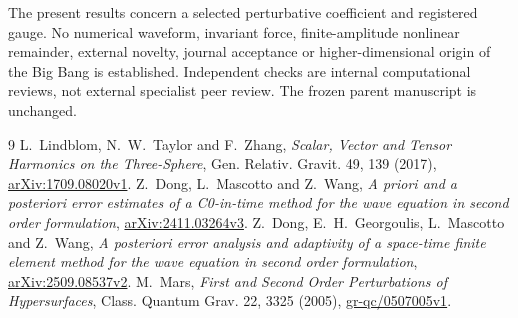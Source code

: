 \documentclass[11pt]{article}
\begin{document}
The present results concern a selected perturbative coefficient and registered gauge. No numerical waveform, invariant force, finite-amplitude nonlinear remainder, external novelty, journal acceptance or higher-dimensional origin of the Big Bang is established. Independent checks are internal computational reviews, not external specialist peer review. The frozen parent manuscript is unchanged.

\begin{thebibliography}{9}
 L.~Lindblom, N.~W.~Taylor and F.~Zhang, \emph{Scalar, Vector and Tensor Harmonics on the Three-Sphere}, Gen. Relativ. Gravit. 49, 139 (2017), \href{https://arxiv.org/abs/1709.08020v1}{arXiv:1709.08020v1}.
 Z.~Dong, L.~Mascotto and Z.~Wang, \emph{A priori and a posteriori error estimates of a C0-in-time method for the wave equation in second order formulation}, \href{https://arxiv.org/abs/2411.03264v3}{arXiv:2411.03264v3}.
 Z.~Dong, E.~H.~Georgoulis, L.~Mascotto and Z.~Wang, \emph{A posteriori error analysis and adaptivity of a space-time finite element method for the wave equation in second order formulation}, \href{https://arxiv.org/abs/2509.08537v2}{arXiv:2509.08537v2}.
 M.~Mars, \emph{First and Second Order Perturbations of Hypersurfaces}, Class. Quantum Grav. 22, 3325 (2005), \href{https://arxiv.org/abs/gr-qc/0507005v1}{gr-qc/0507005v1}.
\end{thebibliography}
\end{document}
